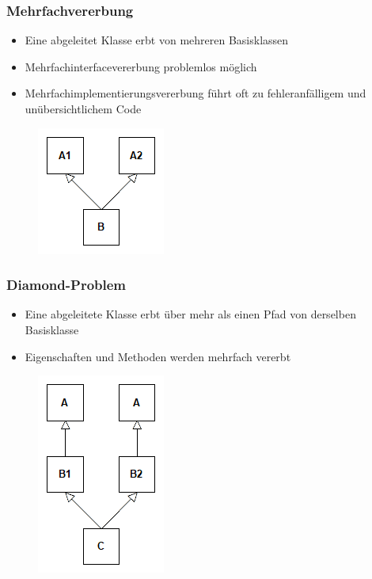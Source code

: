 {
\begin{frame}
	\frametitle{Mehrfachvererbung}
	\begin{itemize}
		\item Eine abgeleitet Klasse erbt von mehreren Basisklassen
		\item Mehrfachinterfacevererbung problemlos möglich
		\item Mehrfachimplementierungsvererbung führt oft zu fehleranfälligem und unübersichtlichem Code
	\end{itemize}
	\begin{figure}[H]
		\includegraphics[scale=0.75]{vererbung/mehrfach/mehrfach.png}
	\end{figure}
\end{frame}
}

{
\begin{frame}
	\frametitle{Diamond-Problem}
	\begin{itemize}
		\item Eine abgeleitete Klasse erbt über mehr als einen Pfad von derselben Basisklasse
		\item Eigenschaften und Methoden werden mehrfach vererbt
	\end{itemize}
	\begin{figure}[H]
		\includegraphics[scale=0.75]{vererbung/mehrfach/diamond/nicht_virtuell.png}
	\end{figure}
\end{frame}
}

